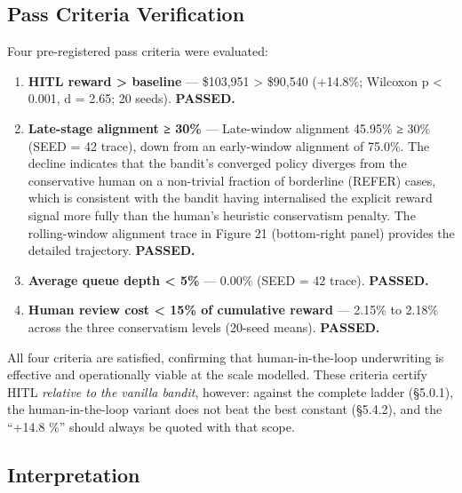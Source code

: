 
\subsection{Pass Criteria Verification}\label{pass-criteria-verification}

Four pre-registered pass criteria were evaluated:

\begin{enumerate}
\def\labelenumi{\arabic{enumi}.}
\tightlist
\item
  \textbf{HITL reward \textgreater{} baseline} --- \$103,951 \textgreater{} \$90,540 (+14.8\%; Wilcoxon p \textless{} 0.001, d = 2.65; 20 seeds). \textbf{PASSED.}
\item
  \textbf{Late-stage alignment ≥ 30\%} --- Late-window alignment 45.95\% ≥ 30\% (SEED = 42 trace), down from an early-window alignment of 75.0\%. The decline indicates that the bandit's converged policy diverges from the conservative human on a non-trivial fraction of borderline (REFER) cases, which is consistent with the bandit having internalised the explicit reward signal more fully than the human's heuristic conservatism penalty. The rolling-window alignment trace in Figure 21 (bottom-right panel) provides the detailed trajectory. \textbf{PASSED.}
\item
  \textbf{Average queue depth \textless{} 5\%} --- 0.00\% (SEED = 42 trace). \textbf{PASSED.}
\item
  \textbf{Human review cost \textless{} 15\% of cumulative reward} --- 2.15\% to 2.18\% across the three conservatism levels (20-seed means). \textbf{PASSED.}
\end{enumerate}

All four criteria are satisfied, confirming that human-in-the-loop underwriting is effective and operationally viable at the scale modelled. These criteria certify HITL \emph{relative to the vanilla bandit}, however: against the complete ladder (§5.0.1), the human-in-the-loop variant does not beat the best constant (§5.4.2), and the ``+14.8 \%'' should always be quoted with that scope.

\subsection{Interpretation}\label{interpretation}

